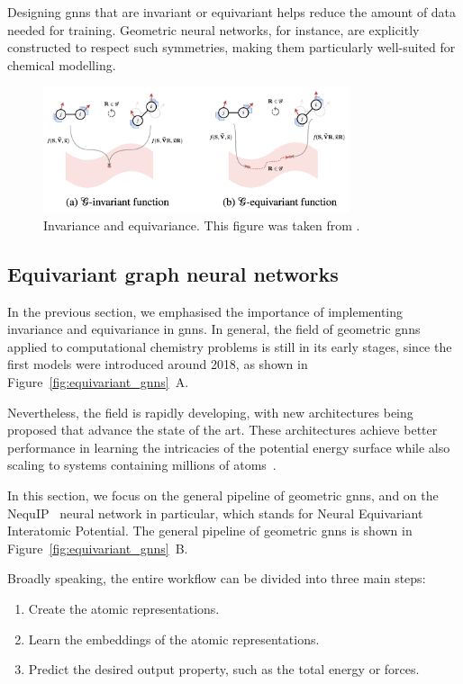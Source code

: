 Designing \acp{gnn} that are invariant or equivariant helps reduce the amount of data needed for training. Geometric neural networks, for instance, are explicitly constructed to respect such symmetries, making them particularly well-suited for chemical modelling.

\begin{figure}[t!]
    \centering
    \includegraphics[width=0.8\textwidth]{Figures/2_Theory/invariance_equivariance.png}
    \caption{Invariance and equivariance. This figure was taken from \citep{duvalHitchhikersGuideGeometric2024}.}
    \label{fig:invariance_equivariance}
\end{figure}



\subsection{Equivariant graph neural networks}
In the previous section, we emphasised the importance of implementing invariance and equivariance in \acp{gnn}. In general, the field of geometric \acp{gnn} applied to computational chemistry problems is still in its early stages, since the first models were introduced around 2018, as shown in Figure~\ref{fig:equivariant_gnns}~A.

Nevertheless, the field is rapidly developing, with new architectures being proposed that advance the state of the art. These architectures achieve better performance in learning the intricacies of the potential energy surface while also scaling to systems containing millions of atoms~\citep{musaelianLearningLocalEquivariant2023}.

In this section, we focus on the general pipeline of geometric \acp{gnn}, and on the NequIP~\citep{batznerE3equivariantGraphNeural2022} neural network in particular, which stands for Neural Equivariant Interatomic Potential. The general pipeline of geometric \acp{gnn} is shown in Figure~\ref{fig:equivariant_gnns}~B.

Broadly speaking, the entire workflow can be divided into three main steps:
\begin{enumerate}
    \item Create the atomic representations.
    \item Learn the embeddings of the atomic representations.
    \item Predict the desired output property, such as the total energy or forces.
\end{enumerate}

